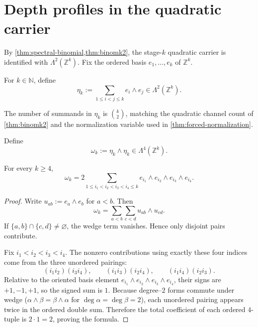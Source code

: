 \section{Depth profiles in the quadratic carrier}
\label{sec:numbers-depth-profile}

By \cref{thm:spectral-binomial,thm:binomk2}, the stage-\(k\) quadratic
carrier is identified with
\(\Lambda^2(\mathbb Z^k)\).
Fix the ordered basis \(e_1,\dots,e_k\) of \(\mathbb Z^k\).

\begin{definition}
\label{def:numbers-depth-profile}
For \(k\in\mathbb N\), define
\[
  \eta_k
  :=
  \sum_{1\le i<j\le k} e_i\wedge e_j
  \in \Lambda^2(\mathbb Z^k).
\]
\end{definition}

\begin{remark}
\label{rem:numbers-q2-compatibility}
The number of summands in \(\eta_k\) is \(\binom{k}{2}\),
matching the quadratic channel count of \cref{thm:binomk2} and the
normalization variable used in \cref{thm:forced-normalization}.
\end{remark}

\begin{definition}
\label{def:numbers-quartic-profile}
Define
\[
  \omega_k := \eta_k\wedge\eta_k
  \in \Lambda^4(\mathbb Z^k).
\]
\end{definition}

\begin{lemma}
\label{lem:numbers-quartic-expansion}
For every \(k\ge 4\),
\[
  \omega_k
  =
  2\sum_{1\le i_1<i_2<i_3<i_4\le k}
  e_{i_1}\wedge e_{i_2}\wedge e_{i_3}\wedge e_{i_4}.
\]
\end{lemma}

\begin{proof}
Write \(u_{ab}:=e_a\wedge e_b\) for \(a<b\).
Then
\[
  \omega_k
  =
  \sum_{a<b}\sum_{c<d} u_{ab}\wedge u_{cd}.
\]
If \(\{a,b\}\cap\{c,d\}\neq\varnothing\), the wedge term vanishes.
Hence only disjoint pairs contribute.

Fix \(i_1<i_2<i_3<i_4\).
The nonzero contributions using exactly these four indices come from the
three unordered pairings:
\[
  (i_1i_2)(i_3i_4),\qquad
  (i_1i_3)(i_2i_4),\qquad
  (i_1i_4)(i_2i_3).
\]
Relative to the oriented basis element
\(e_{i_1}\wedge e_{i_2}\wedge e_{i_3}\wedge e_{i_4}\), their signs are
\(+1,-1,+1\), so the signed sum is \(1\).
Because degree--\(2\) forms commute under wedge
(\(\alpha\wedge\beta=\beta\wedge\alpha\) for \(\deg\alpha=\deg\beta=2\)),
each unordered pairing appears twice in the ordered double sum.
Therefore the total coefficient of each ordered \(4\)-tuple is
\(2\cdot 1=2\), proving the formula.
\end{proof}

